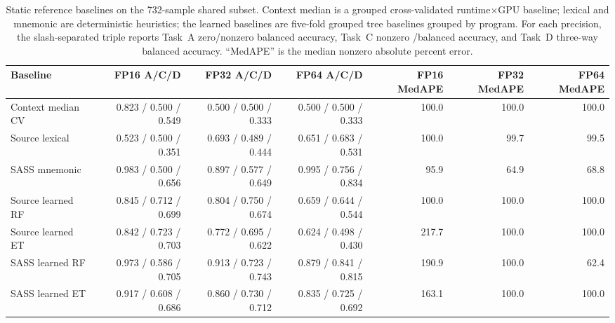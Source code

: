 \begin{table}[t]
  \centering
  \caption{Static reference baselines on the 732-sample shared subset. Context median is a grouped cross-validated runtime$\times$GPU baseline; lexical and mnemonic are deterministic heuristics; the learned baselines are five-fold grouped tree baselines grouped by program. For each precision, the slash-separated triple reports Task~A zero/nonzero balanced accuracy, Task~C nonzero \bandwidthbound/\computebound balanced accuracy, and Task~D three-way balanced accuracy. ``MedAPE'' is the median nonzero absolute percent error.}
  \label{tab:static-baselines}
  \scriptsize
  \setlength{\tabcolsep}{4pt}
  \begin{tabular}{lrrrrrr}
    \toprule
    Baseline & FP16 A/C/D & FP32 A/C/D & FP64 A/C/D & FP16 MedAPE & FP32 MedAPE & FP64 MedAPE \\
    \midrule
    Context median CV & 0.823 / 0.500 / 0.549 & 0.500 / 0.500 / 0.333 & 0.500 / 0.500 / 0.333 & 100.0 & 100.0 & 100.0 \\
    Source lexical & 0.523 / 0.500 / 0.351 & 0.693 / 0.489 / 0.444 & 0.651 / 0.683 / 0.531 & 100.0 & 99.7 & 99.5 \\
    SASS mnemonic & 0.983 / 0.500 / 0.656 & 0.897 / 0.577 / 0.649 & 0.995 / 0.756 / 0.834 & 95.9 & 64.9 & 68.8 \\
    Source learned RF & 0.845 / 0.712 / 0.699 & 0.804 / 0.750 / 0.674 & 0.659 / 0.644 / 0.544 & 100.0 & 100.0 & 100.0 \\
    Source learned ET & 0.842 / 0.723 / 0.703 & 0.772 / 0.695 / 0.622 & 0.624 / 0.498 / 0.430 & 217.7 & 100.0 & 100.0 \\
    SASS learned RF & 0.973 / 0.586 / 0.705 & 0.913 / 0.723 / 0.743 & 0.879 / 0.841 / 0.815 & 190.9 & 100.0 & 62.4 \\
    SASS learned ET & 0.917 / 0.608 / 0.686 & 0.860 / 0.730 / 0.712 & 0.835 / 0.725 / 0.692 & 163.1 & 100.0 & 100.0 \\
    \bottomrule
  \end{tabular}
\end{table}
